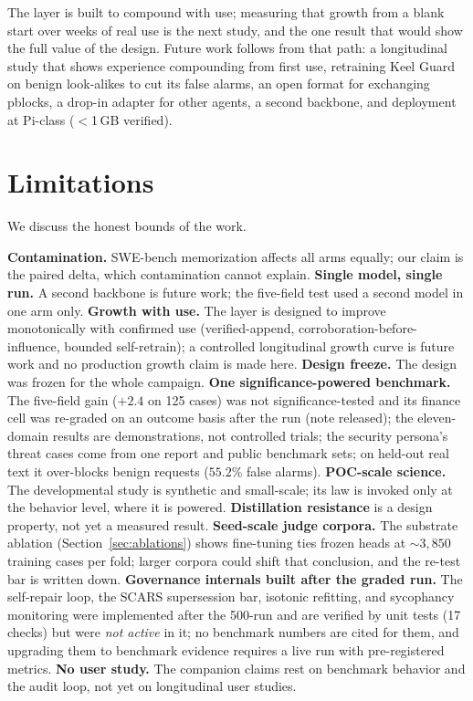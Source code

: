 \documentclass[11pt]{article}
\begin{document}
The layer is built to compound with use; measuring that growth from a blank start over weeks of real use is the next study, and the one result that would show the full value of the design. Future work follows from that path: a longitudinal study that shows experience compounding from first use, retraining Keel Guard on benign look-alikes to cut its false alarms, an open format for exchanging pblocks, a drop-in adapter for other agents, a second backbone, and deployment at Pi-class ($<$1\,GB verified).

\section{Limitations}
\label{sec:limitations}
We discuss the honest bounds of the work.

\textbf{Contamination.} SWE-bench memorization \cite{swebenchillusion2025,swebenchplus2024} affects all arms equally; our claim is the paired delta, which contamination cannot explain. \textbf{Single model, single run.} A second backbone is future work; the five-field test used a second model in one arm only. \textbf{Growth with use.} The layer is designed to improve monotonically with confirmed use (verified-append, corroboration-before-influence, bounded self-retrain); a controlled longitudinal growth curve is future work and no production growth claim is made here. \textbf{Design freeze.} The design was frozen for the whole campaign. \textbf{One significance-powered benchmark.} The five-field gain ($+2.4$ on 125 cases) was not significance-tested and its finance cell was re-graded on an outcome basis after the run (note released); the eleven-domain results are demonstrations, not controlled trials; the security persona's threat cases come from one report and public benchmark sets; on held-out real text it over-blocks benign requests ($55.2\%$ false alarms). \textbf{POC-scale science.} The developmental study is synthetic and small-scale; its law is invoked only at the behavior level, where it is powered. \textbf{Distillation resistance} is a design property, not yet a measured result. \textbf{Seed-scale judge corpora.} The substrate ablation (Section~\ref{sec:ablations}) shows fine-tuning ties frozen heads at ${\sim}3{,}850$ training cases per fold; larger corpora could shift that conclusion, and the re-test bar is written down. \textbf{Governance internals built after the graded run.} The self-repair loop, the SCARS supersession bar, isotonic refitting, and sycophancy monitoring were implemented after the 500-run and are verified by unit tests (17 checks) but were \emph{not active} in it; no benchmark numbers are cited for them, and upgrading them to benchmark evidence requires a live run with pre-registered metrics. \textbf{No user study.} The companion claims rest on benchmark behavior and the audit loop, not yet on longitudinal user studies.
\end{document}
